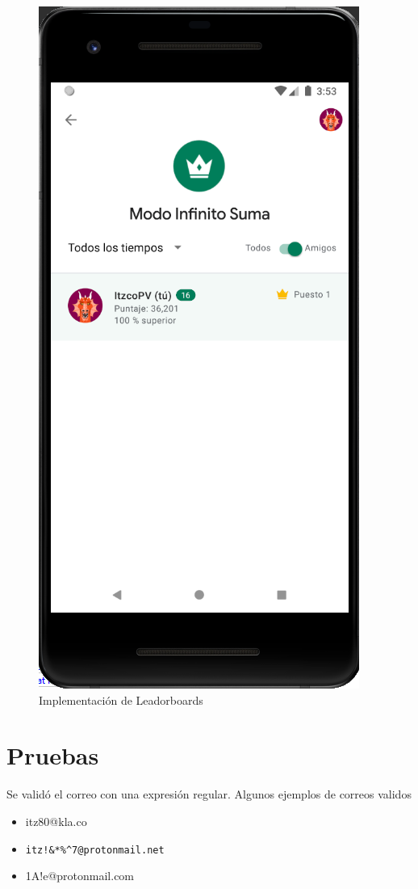 \documentclass{article}
\begin{document}
\begin{figure}[H]
    \centering
    \includegraphics[scale=0.8]{imgs/Imp/Leaderboards}
    \caption{Implementación de Leadorboards}
\end{figure}
\section{Pruebas}%
Se validó el correo con una expresión regular. Algunos ejemplos de correos validos
\begin{itemize}
	\item itz80@kla.co
	\item \verb |itz!&*%
	\item 1A!e@protonmail.com
\end{itemize}

\pagebreak
\printbibliography
\end{document}
